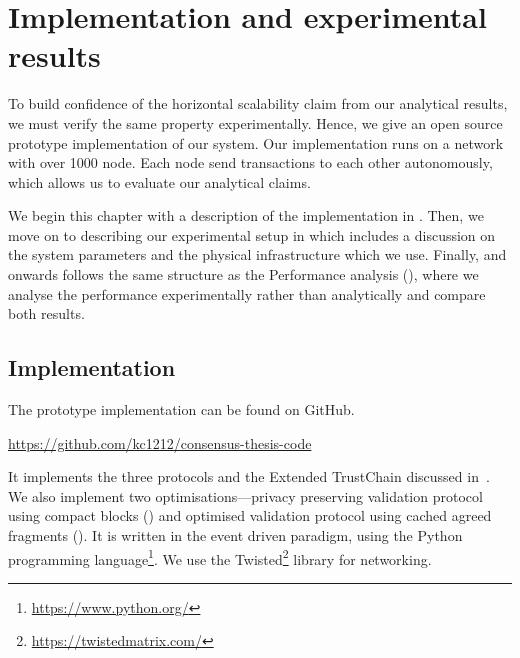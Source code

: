 \chapter{Implementation and experimental results}
\label{ch:implementation}

To build confidence of the horizontal scalability claim from our analytical results,
we must verify the same property experimentally.
Hence, we give an open source prototype implementation of our system.
Our implementation runs on a network with over 1000 node.
Each node send transactions to each other autonomously, 
which allows us to evaluate our analytical claims.

We begin this chapter with a description of the implementation in .
Then, we move on to describing our experimental setup in  which includes a discussion on the system parameters and the physical infrastructure which we use.
Finally,  and onwards follows the same structure as the Performance analysis (),
where we analyse the performance experimentally rather than analytically and compare both results.


\section{Implementation}
\label{sec:implementation}

The prototype implementation can be found on GitHub.
\begin{displayquote}
\url{https://github.com/kc1212/consensus-thesis-code}
\end{displayquote}
It implements the three protocols and the Extended TrustChain discussed in~.
We also implement two optimisations---privacy preserving validation protocol using compact blocks ()
and optimised validation protocol using cached agreed fragments ().
It is written in the event driven paradigm, using the Python programming language\footnote{\url{https://www.python.org/}}.
We use the Twisted\footnote{\url{https://twistedmatrix.com/}} library for networking.

